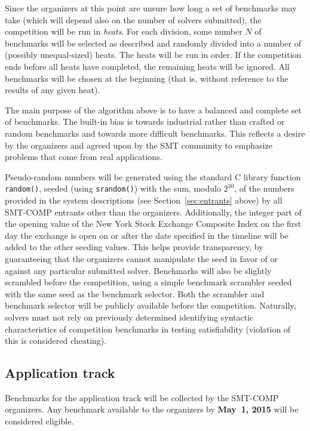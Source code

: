 \documentclass[12pt]{article}
\begin{document}
Since the organizers at this point are unsure how long a set of
benchmarks may take (which will depend also on the number of solvers
submitted), the competition will be run in {\em heats}. For each
division, some number $N$ of benchmarks will be selected as described
and randomly divided into a number of (possibly unequal-sized)
heats. The heats will be run in order. If the competition ends before
all heats have completed, the remaining heats will be ignored. All
benchmarks will be chosen at the beginning (that is, without reference
to the results of any given heat).

The main purpose of the algorithm above is to have a balanced and
complete set of benchmarks.  The built-in bias is towards industrial
rather than crafted or random benchmarks and towards more difficult
benchmarks.  This reflects a desire by the organizers and agreed upon
by the SMT community to emphasize problems that come from real
applications.

Pseudo-random numbers will be generated using the standard C library
function \texttt{random()}, seeded (using \texttt{srandom()}) with the
sum, modulo $2^{30}$, of the numbers provided in the system
descriptions (see Section~\ref{sec:entrants} above) by all SMT-COMP
entrants other than the organizers.  Additionally, the integer part of
the opening value of the New York Stock Exchange Composite Index on
the first day the exchange is open on or after the date specified in
the timeline will be added to the other seeding values.  This helps
provide transparency, by guaranteeing that the organizers cannot
manipulate the seed in favor of or against any particular submitted
solver.  Benchmarks will also be slightly scrambled before the
competition, using a simple benchmark scrambler seeded with the same
seed as the benchmark selector.  Both the scrambler and benchmark
selector will be publicly available before the competition.
Naturally, solvers must not rely on previously determined identifying
syntactic characteristics of competition benchmarks in testing
satisfiability (violation of this is considered cheating).

\subsection{Application track}

%
Benchmarks for the application track will be collected by the SMT-COMP
organizers.  Any benchmark available to the organizers by {\bf May~1,
  2015} will be considered eligible.
\end{document}
